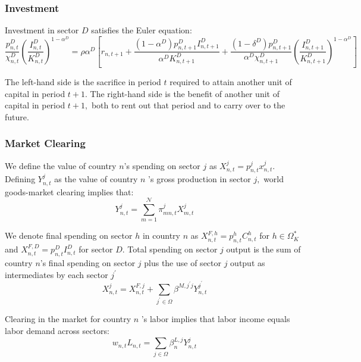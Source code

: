 \documentclass[12pt, bibtotoc, tablecaptionabove, figurecaptionabove, fleqn]{article}
\begin{document}
\subsubsection{Investment}
Investment in sector $D$ satisfies the Euler equation:
\begin{equation*}
	\frac{p_{n, t}^{D}}{\chi_{n, t}^{D}}\left(\frac{I_{n, t}^{D}}{K_{n, t}^{D}}\right)^{1-\alpha^D}=\rho \alpha^D\left[r_{n, t+1}+\frac{\left(1-\alpha^D\right) p_{n, t+1}^{D} I_{n, t+1}^{D}}{\alpha^D K_{n, t+1}^{D}}+\frac{\left(1-\delta^{D}\right) p_{n, t+1}^{D}}{\alpha^D \chi_{n, t+1}^{D}}\left(\frac{I_{n, t+1}^{D}}{K_{n, t+1}^{D}}\right)^{1-\alpha^D}\right]
\end{equation*}

The left-hand side is the sacrifice in period $t$ required to attain another unit of capital in period $t+1$. The right-hand side is the benefit of another unit of capital in period $t+1,$ both to rent out that period and to carry over to the future. 

\subsubsection{Market Clearing}

We define the value of country $n$'s spending on sector $j$ as $X_{n, t}^{j}=p_{n, t}^{j} x_{n, t}^{j}$. Defining $Y_{n, t}^{j}$ as the value of country $n$ 's gross production in sector $j,$ world goods-market clearing implies that:
\begin{equation*}
	Y_{n, t}^{j}=\sum_{m=1}^{\mathcal{N}} \pi_{m n, t}^{j} X_{m, t}^{j}
\end{equation*}

We denote final spending on sector $h$ in country $n$ as $X_{n, t}^{F, h} = p_{n, t}^{h} C_{n, t}^{h}$ for $h \in \Omega_{K}^{*}$ and $X_{n, t}^{F, D}=p_{n, t}^{D} I_{n, t}^{D}$ for sector $D$. Total spending on sector $j$ output is the sum of country $n$'s final spending on sector $j$ plus the use of sector $j$ output as intermediates by each sector $j^{\prime}$
\begin{equation*}
	X_{n, t}^{j}=X_{n, t}^{F, j}+\sum_{j^{\prime} \in \Omega} \beta^{M, j^{\prime} j} Y_{n, t}^{j^{\prime}}
\end{equation*}

Clearing in the market for country $n$ 's labor implies that labor income equals labor demand across sectors:
\begin{equation*}
	w_{n, t} L_{n, t}=\sum_{j \in \Omega} \beta_{n}^{L, j} Y_{n, t}^{j}
\end{equation*}
\end{document}
